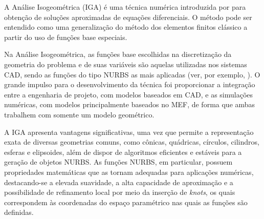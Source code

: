 \documentclass[tese_patricia]{subfiles}
\begin{document}


A Análise Isogeométrica (IGA) é uma técnica numérica introduzida por  para obtenção de soluções aproximadas de equações diferenciais. O método pode ser entendido como uma generalização do método dos elementos finitos clássico a partir do uso de funções base especiais. 

Na Análise Isogeométrica, as funções base escolhidas na discretização da geometria do problema e de suas variáveis são aquelas utilizadas nos sistemas CAD, sendo as funções do tipo NURBS as mais aplicadas (ver, por exemplo, ). O grande impulso para o desenvolvimento da técnica foi proporcionar a integração entre a engenharia de projeto, com modelos baseados em CAD, e as simulações numéricas, com modelos principalmente baseados no MEF, de forma que ambas trabalhem com somente um modelo geométrico.

A IGA apresenta vantagens significativas, uma vez que permite a representação exata de diversas geometrias comuns, como cônicas, quádricas, círculos, cilindros, esferas e elipsoides, além de dispor de algoritmos eficientes e estáveis para a geração de objetos NURBS. As funções NURBS, em particular, possuem propriedades matemáticas que as tornam adequadas para aplicações numéricas, destacando-se a elevada suavidade, a alta capacidade de aproximação e a possibilidade de refinamento local por meio da inserção de \textit{knots}, os quais correspondem às coordenadas do espaço paramétrico nas quais as funções são definidas.
\end{document}
